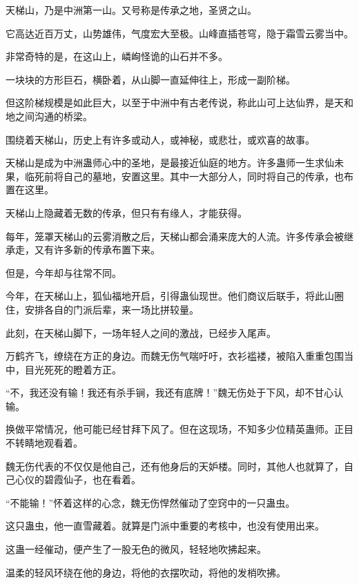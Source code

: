 
\begin{this_body}



天梯山，乃是中洲第一山。又号称是传承之地，圣贤之山。

它高达近百万丈，山势雄伟，气度宏大至极。山峰直插苍穹，隐于霜雪云雾当中。

非常奇特的是，在这山上，嶙峋怪诡的山石并不多。

一块块的方形巨石，横卧着，从山脚一直延伸往上，形成一副阶梯。

但这阶梯规模是如此巨大，以至于中洲中有古老传说，称此山可上达仙界，是天和地之间沟通的桥梁。

围绕着天梯山，历史上有许多或动人，或神秘，或悲壮，或欢喜的故事。

天梯山是成为中洲蛊师心中的圣地，是最接近仙庭的地方。许多蛊师一生求仙未果，临死前将自己的墓地，安置这里。其中一大部分人，同时将自己的传承，也布置在这里。

天梯山上隐藏着无数的传承，但只有有缘人，才能获得。

每年，笼罩天梯山的云雾消散之后，天梯山都会涌来庞大的人流。许多传承会被继承走，又有许多新的传承布置下来。

但是，今年却与往常不同。

今年，在天梯山上，狐仙福地开启，引得蛊仙现世。他们商议后联手，将此山圈住，安排各自的门派后辈，来一场比拼较量。

此刻，在天梯山脚下，一场年轻人之间的激战，已经步入尾声。

万鹤齐飞，缭绕在方正的身边。而魏无伤气喘吁吁，衣衫褴褛，被陷入重重包围当中，目光死死的瞪着方正。

“不，我还没有输！我还有杀手锏，我还有底牌！”魏无伤处于下风，却不甘心认输。

换做平常情况，他可能已经甘拜下风了。但在这现场，不知多少位精英蛊师。正目不转睛地观看着。

魏无伤代表的不仅仅是他自己，还有他身后的天妒楼。同时，其他人也就算了，自己心仪的碧霞仙子，也在看着。

“不能输！”怀着这样的心念，魏无伤悍然催动了空窍中的一只蛊虫。

这只蛊虫，他一直雪藏着。就算是门派中重要的考核中，也没有使用出来。

这蛊一经催动，便产生了一股无色的微风，轻轻地吹拂起来。

温柔的轻风环绕在他的身边，将他的衣摆吹动，将他的发梢吹拂。


\end{this_body}
